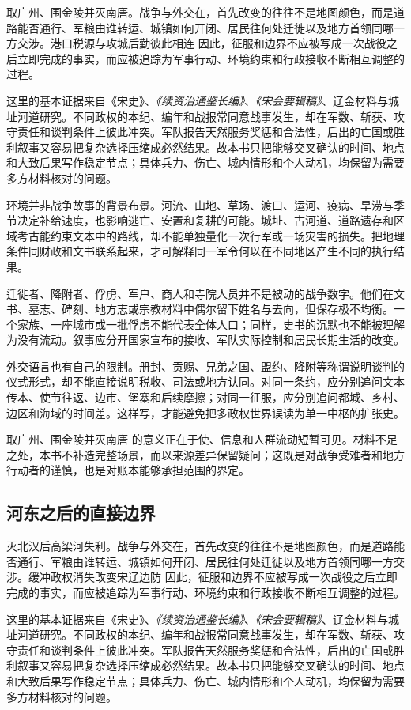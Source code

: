 取广州、围金陵并灭南唐。战争与外交在，首先改变的往往不是地图颜色，而是道路能否通行、军粮由谁转运、城镇如何开闭、居民往何处迁徙以及地方首领同哪一方交涉。港口税源与攻城后勤彼此相连 因此，征服和边界不应被写成一次战役之后立即完成的事实，而应被追踪为军事行动、环境约束和行政接收不断相互调整的过程。

这里的基本证据来自《宋史》、\textit{《续资治通鉴长编》}、\textit{《宋会要辑稿》}、辽金材料与城址河道研究。不同政权的本纪、编年和战报常同意战事发生，却在军数、斩获、攻守责任和谈判条件上彼此冲突。军队报告天然服务奖惩和合法性，后出的亡国或胜利叙事又容易把复杂选择压缩成必然结果。故本书只把能够交叉确认的时间、地点和大致后果写作稳定节点；具体兵力、伤亡、城内情形和个人动机，均保留为需要多方材料核对的问题。

环境并非战争故事的背景布景。河流、山地、草场、渡口、运河、疫病、旱涝与季节决定补给速度，也影响逃亡、安置和复耕的可能。城址、古河道、道路遗存和区域考古能约束文本中的路线，却不能单独量化一次行军或一场灾害的损失。把地理条件同财政和文书联系起来，才可解释同一军令何以在不同地区产生不同的执行结果。

迁徙者、降附者、俘虏、军户、商人和寺院人员并不是被动的战争数字。他们在文书、墓志、碑刻、地方志或宗教材料中偶尔留下姓名与去向，但保存极不均衡。一个家族、一座城市或一批俘虏不能代表全体人口；同样，史书的沉默也不能被理解为没有流动。叙事应分开国家宣布的接收、军队实际控制和居民长期生活的改变。

外交语言也有自己的限制。册封、贡赐、兄弟之国、盟约、降附等称谓说明谈判的仪式形式，却不能直接说明税收、司法或地方认同。对同一条约，应分别追问文本传本、使节往返、边市、堡寨和后续摩擦；对同一征服，应分别追问都城、乡村、边区和海域的时间差。这样写，才能避免把多政权世界误读为单一中枢的扩张史。

取广州、围金陵并灭南唐 的意义正在于使、信息和人群流动短暂可见。材料不足之处，本书不补造完整场景，而以来源差异保留疑问；这既是对战争受难者和地方行动者的谨慎，也是对账本能够承担范围的界定。

\subsection{河东之后的直接边界}

灭北汉后高梁河失利。战争与外交在，首先改变的往往不是地图颜色，而是道路能否通行、军粮由谁转运、城镇如何开闭、居民往何处迁徙以及地方首领同哪一方交涉。缓冲政权消失改变宋辽边防 因此，征服和边界不应被写成一次战役之后立即完成的事实，而应被追踪为军事行动、环境约束和行政接收不断相互调整的过程。

这里的基本证据来自《宋史》、\textit{《续资治通鉴长编》}、\textit{《宋会要辑稿》}、辽金材料与城址河道研究。不同政权的本纪、编年和战报常同意战事发生，却在军数、斩获、攻守责任和谈判条件上彼此冲突。军队报告天然服务奖惩和合法性，后出的亡国或胜利叙事又容易把复杂选择压缩成必然结果。故本书只把能够交叉确认的时间、地点和大致后果写作稳定节点；具体兵力、伤亡、城内情形和个人动机，均保留为需要多方材料核对的问题。

